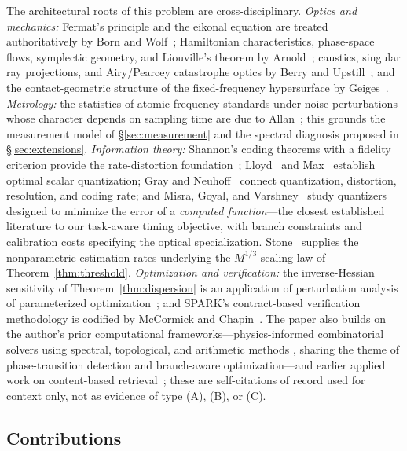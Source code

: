 \documentclass[11pt]{article}
\begin{document}
The architectural roots of this problem are cross-disciplinary.
\emph{Optics and mechanics:} Fermat's principle and the eikonal equation are treated
authoritatively by Born and Wolf~\cite{bornwolf1999}; Hamiltonian characteristics,
phase-space flows, symplectic geometry, and Liouville's theorem by
Arnold~\cite{arnold1989}; caustics, singular ray projections, and Airy/Pearcey
catastrophe optics by Berry and Upstill~\cite{berry1980,pearcey1946,airy1841}; and the
contact-geometric structure of the fixed-frequency hypersurface by
Geiges~\cite{geiges2008}.
\emph{Metrology:} the statistics of atomic frequency standards under noise perturbations
whose character depends on sampling time are due to Allan~\cite{allan1966}; this grounds
the measurement model of \S\ref{sec:measurement} and the spectral diagnosis proposed in
\S\ref{sec:extensions}.
\emph{Information theory:} Shannon's coding theorems with a fidelity criterion provide the
rate-distortion foundation~\cite{shannon1959}; Lloyd~\cite{lloyd1982} and Max~\cite{max1960}
establish optimal scalar quantization; Gray and Neuhoff~\cite{gray1998} connect quantization,
distortion, resolution, and coding rate; and Misra, Goyal, and Varshney~\cite{misra2011} study
quantizers designed to minimize the error of a \emph{computed function}---the closest
established literature to our task-aware timing objective, with branch constraints and
calibration costs specifying the optical specialization. Stone~\cite{stone1982} supplies the
nonparametric estimation rates underlying the $M^{1/3}$ scaling law of
Theorem~\ref{thm:threshold}.
\emph{Optimization and verification:} the inverse-Hessian sensitivity of
Theorem~\ref{thm:dispersion} is an application of perturbation analysis of parameterized
optimization~\cite{bonnans2000}; and SPARK's contract-based verification methodology is
codified by McCormick and Chapin~\cite{mccormick2015}.
The paper also builds on the author's prior computational frameworks---physics-informed
combinatorial solvers using spectral, topological, and arithmetic methods
\cite{nitrosat,multiplicative,shunyabar,banzhaf,spectralmult,quantumvacuum}, sharing the
theme of phase-transition detection and branch-aware optimization---and earlier applied work
on content-based retrieval~\cite{imagecaptioning}; these are self-citations of record used
for context only, not as evidence of type (A), (B), or (C).

\subsection{Contributions}
\end{document}
